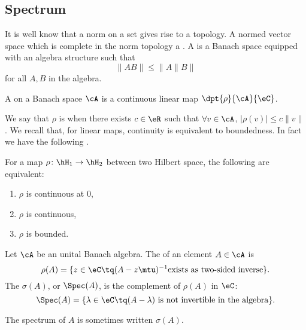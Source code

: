 \subsection{Spectrum}

It is well know that a norm on a set gives rise to a topology. A normed vector space which is complete in the norm topology a . A  is a Banach space equipped with an algebra structure such that 
\begin{equation} \label{eq:normBanach}
  \|AB\|\leq\|A\|B\|
\end{equation}
for all $A,B$ in the algebra. \label{def_banach}

\begin{definition}			\label{def:fonctionelle}
A  on a Banach space $\cA$ is a continuous linear map $\dpt{\rho}{\cA}{\eC}$. 
\end{definition}
We say that $\rho$ is  when there exists $c\in\eR$ such that $\forall v\in\cA$,  $|\rho(v)|\leq c\|v\|$.  We recall that, for linear maps, continuity is equivalent to boundedness. In fact we have the following \cite{Ops_Hilb_space}.
\begin{proposition}
	For a map $\rho\colon \hH_1\to \hH_2$ between two Hilbert space, the following are equivalent:
	\begin{enumerate}
	\item $\rho$ is continuous at $0$,
	\item $\rho$ is continuous,
	\item $\rho$ is bounded.
	\end{enumerate}
\end{proposition}

\begin{definition} 
	Let $\cA$ be an unital Banach algebra. The  of an element $A\in \cA$ is
	\begin{equation}
	  \rho(A)=\{ z\in\eC\tq(A-z\mtu)^{-1}\text{exists as two-sided inverse}  \}.
	\end{equation}
	The  $\sigma(A)$, or $\Spec(A)$, is the complement of $\rho(A)$ in $\eC$:
	\begin{equation}
        \Spec(A)=\{ \lambda\in\eC\tq(A-\lambda) \text{ is not invertible in the algebra} \}.
	\end{equation}
\end{definition}
The spectrum of $A$ is sometimes written $\sigma(A)$. 


